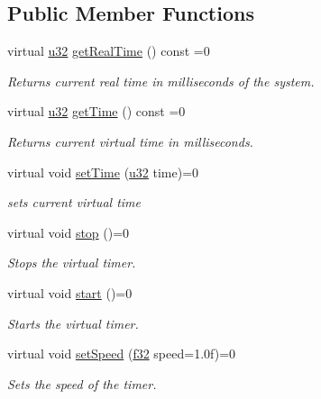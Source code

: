 \subsection*{Public Member Functions}
\begin{DoxyCompactItemize}
\item 
virtual \hyperlink{namespaceirr_a0416a53257075833e7002efd0a18e804}{u32} \hyperlink{classirr_1_1ITimer_a67d6b3ae61c2e6aaad82c4ae15ab55f1}{get\+Real\+Time} () const =0
\begin{DoxyCompactList}\small\item\em Returns current real time in milliseconds of the system. \end{DoxyCompactList}\item 
virtual \hyperlink{namespaceirr_a0416a53257075833e7002efd0a18e804}{u32} \hyperlink{classirr_1_1ITimer_aa2c53890268d6886b3b5bbf2af5dba9c}{get\+Time} () const =0
\begin{DoxyCompactList}\small\item\em Returns current virtual time in milliseconds. \end{DoxyCompactList}\item 
\mbox{\label{classirr_1_1ITimer_ae93bf312ccf87478565e080450291386}} 
virtual void \hyperlink{classirr_1_1ITimer_ae93bf312ccf87478565e080450291386}{set\+Time} (\hyperlink{namespaceirr_a0416a53257075833e7002efd0a18e804}{u32} time)=0
\begin{DoxyCompactList}\small\item\em sets current virtual time \end{DoxyCompactList}\item 
virtual void \hyperlink{classirr_1_1ITimer_a649e7294fafc6e6de00f9a4dc6894c16}{stop} ()=0
\begin{DoxyCompactList}\small\item\em Stops the virtual timer. \end{DoxyCompactList}\item 
virtual void \hyperlink{classirr_1_1ITimer_a9467dc5a72de3869712715d0473c9697}{start} ()=0
\begin{DoxyCompactList}\small\item\em Starts the virtual timer. \end{DoxyCompactList}\item 
virtual void \hyperlink{classirr_1_1ITimer_a13f3f4919a3431733bc90cd87d110675}{set\+Speed} (\hyperlink{namespaceirr_a0277be98d67dc26ff93b1a6a1d086b07}{f32} speed=1.\+0f)=0
\begin{DoxyCompactList}\small\item\em Sets the speed of the timer. \end{DoxyCompactList}\item 

\end{DoxyCompactItemize}
